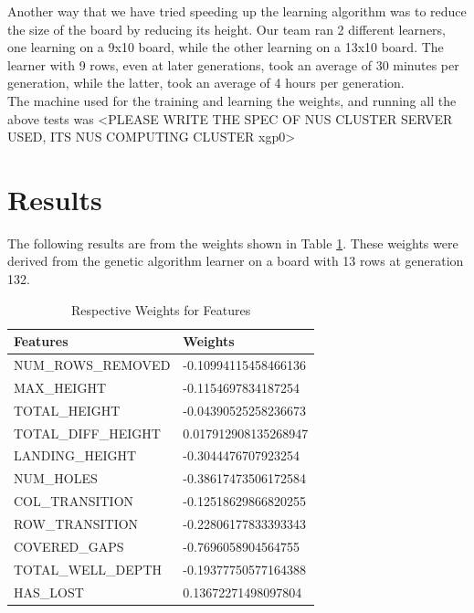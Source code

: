 \documentclass[a4paper,12pt,twocolumn]{article}
\begin{document}
Another way that we have tried speeding up the learning algorithm was to reduce
the size of the board by reducing its height. Our team ran 2 different learners,
one learning on a 9x10 board, while the other learning on a 13x10 board.
The learner with 9 rows, even at later generations, took an average of 30 minutes
per generation, while the latter, took an average of 4 hours per generation.\\

The machine used for the training and learning the weights, and running all the
above tests was <PLEASE WRITE THE SPEC OF NUS CLUSTER SERVER USED, ITS NUS COMPUTING CLUSTER xgp0>

\section{Results}
The following results are from the weights shown in Table \ref{feature_weights}.
These weights were derived from the genetic algorithm learner on a board with 13 rows
at generation 132.

\begin{table}[h]
    \begin{tabular}{|l|l|}
        \hline
        \textbf{Features}   & \textbf{Weights}     \\
        \hline
        NUM\_ROWS\_REMOVED  & -0.10994115458466136 \\
        \hline
        MAX\_HEIGHT         & -0.1154697834187254  \\
        \hline
        TOTAL\_HEIGHT       & -0.04390525258236673 \\
        \hline
        TOTAL\_DIFF\_HEIGHT & 0.017912908135268947 \\
        \hline
        LANDING\_HEIGHT     & -0.3044476707923254  \\
        \hline
        NUM\_HOLES          & -0.38617473506172584 \\
        \hline
        COL\_TRANSITION     & -0.12518629866820255 \\
        \hline
        ROW\_TRANSITION     & -0.22806177833393343 \\
        \hline
        COVERED\_GAPS       & -0.7696058904564755  \\
        \hline
        TOTAL\_WELL\_DEPTH  & -0.19377750577164388 \\
        \hline
        HAS\_LOST           & 0.13672271498097804  \\
        \hline
    \end{tabular}
    \caption{Respective Weights for Features}
    \label{feature_weights}
\end{table}
\end{document}
